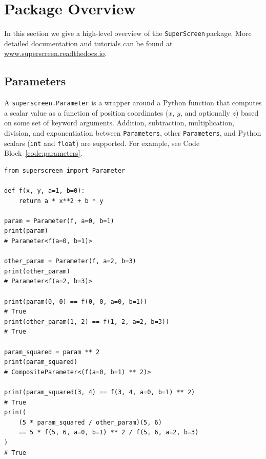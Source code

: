 \documentclass[preprint,12pt]{elsarticle}
\newenvironment{code}{\captionsetup{type=listing}}{}
\newcommand{\SuperScreen}{\texttt{SuperScreen}\,}
\begin{document}
\section{Package Overview}
\label{section:overview}

In this section we give a high-level overview of the \SuperScreen package. More detailed documentation and tutorials can be found at \href{http://www.superscreen.readthedocs.io}{www.superscreen.readthedocs.io}.

\subsection{Parameters}
\label{section:overview:parameter}

A \texttt{superscreen.Parameter} is a wrapper around a Python function that computes a scalar value as a function of position coordinates ($x$, $y$, and optionally $z$) based on some set of keyword arguments. Addition, subtraction, multiplication, division, and exponentiation between \texttt{Parameters}, other \texttt{Parameters}, and Python scalars (\texttt{int} and \texttt{float}) are supported. For example, see Code Block~\ref{code:parameters}.

\begin{code}
\begin{verbatim}
from superscreen import Parameter

def f(x, y, a=1, b=0):
    return a * x**2 + b * y
    
param = Parameter(f, a=0, b=1)
print(param)
# Parameter<f(a=0, b=1)>

other_param = Parameter(f, a=2, b=3)
print(other_param)
# Parameter<f(a=2, b=3)>

print(param(0, 0) == f(0, 0, a=0, b=1))
# True
print(other_param(1, 2) == f(1, 2, a=2, b=3))
# True

param_squared = param ** 2
print(param_squared)
# CompositeParameter<(f(a=0, b=1) ** 2)>

print(param_squared(3, 4) == f(3, 4, a=0, b=1) ** 2)
# True
print(
    (5 * param_squared / other_param)(5, 6)
    == 5 * f(5, 6, a=0, b=1) ** 2 / f(5, 6, a=2, b=3)
)
# True
\end{verbatim}
\label{code:parameters}
\end{code}
\end{document}
